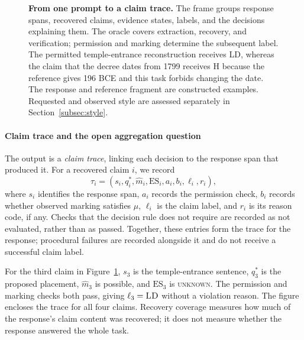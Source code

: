 \documentclass{clv2025}
\newcommand{\LD}{\textsc{LD}}
\newcommand{\Hall}{\textsc{H}}
\begin{document}
\begin{figure}[!t]
{}
\caption{\textbf{From one prompt to a claim trace.}
The frame groups response spans, recovered claims, evidence states, labels,
and the decisions explaining them. The oracle covers extraction, recovery,
and verification; permission and marking determine the subsequent label.
The permitted temple-entrance reconstruction receives \LD{}, whereas the
claim that the decree dates from 1799 receives \Hall{} because the
reference gives 196 BCE and this task forbids changing the date.
The response and reference fragment are constructed examples. Requested
and observed style are assessed separately in Section~\ref{subsec:style}.}

\label{fig:claim-label-annotation}
\end{figure}
\FloatBarrier

\paragraph{Claim trace and the open aggregation question}\label{subsec:response}

The output is a \emph{claim trace}, linking each decision to the response
span that produced it. For a recovered claim $i$, we record
\begin{equation}
\tau_i=(s_i,q_i^*,\widehat{m}_i,\mathrm{ES}_i,a_i,b_i,\ell_i,r_i),
\label{eq:claim-trace}
\end{equation}
where $s_i$ identifies the response span, $a_i$ records the permission check,
$b_i$ records whether observed marking satisfies $\mu$, $\ell_i$ is the
claim label, and $r_i$ is its reason code, if any. Checks that the decision
rule does not require are recorded as not evaluated, rather than as passed.
Together, these entries form the trace for the response; procedural failures
are recorded alongside it and do not receive a successful claim label.

For the third claim in Figure~\ref{fig:claim-label-annotation}, $s_3$ is the
temple-entrance sentence, $q_3^*$ is the proposed placement,
$\widehat{m}_3$ is possible, and $\mathrm{ES}_3$ is \textsc{unknown}.
The permission and marking checks both pass, giving $\ell_3=\LD$ without
a violation reason. The figure encloses the trace for all four claims.
Recovery coverage measures how much of the response's claim content was
recovered; it does not measure whether the response answered the whole task.
\end{document}
